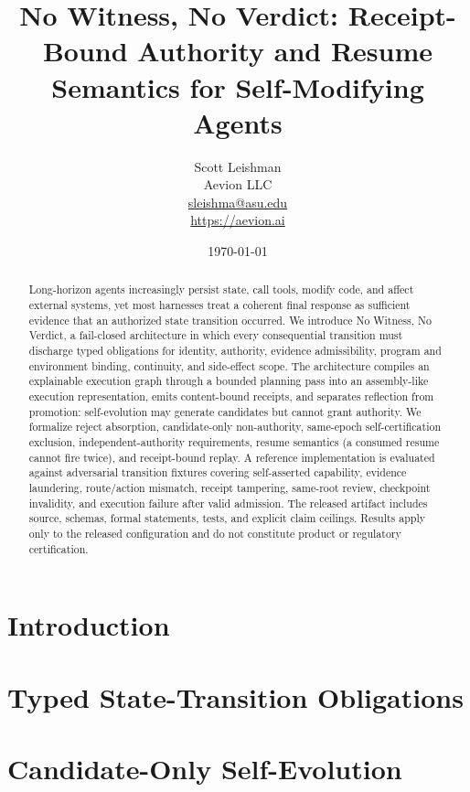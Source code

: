 \documentclass[11pt]{article}
\title{\textbf{No Witness, No Verdict: Receipt-Bound Authority and Resume
Semantics for Self-Modifying Agents}}
\author{Scott Leishman\\
Aevion LLC\\
\href{mailto:sleishma@asu.edu}{sleishma@asu.edu}\\
\href{https://aevion.ai}{https://aevion.ai}}
\date{\today}
\begin{document}
\maketitle

\begin{abstract}
Long-horizon agents increasingly persist state, call tools, modify code, and
affect external systems, yet most harnesses treat a coherent final response
as sufficient evidence that an authorized state transition occurred. We
introduce No Witness, No Verdict, a fail-closed architecture in which every
consequential transition must discharge typed obligations for identity,
authority, evidence admissibility, program and environment binding,
continuity, and side-effect scope. The architecture compiles an explainable
execution graph through a bounded planning pass into an assembly-like
execution representation, emits content-bound receipts, and separates
reflection from promotion: self-evolution may generate candidates but cannot
grant authority. We formalize reject absorption, candidate-only non-authority,
same-epoch self-certification exclusion, independent-authority requirements,
resume semantics (a consumed resume cannot fire twice), and receipt-bound
replay. A reference implementation is evaluated against adversarial
transition fixtures covering self-asserted capability, evidence laundering,
route/action mismatch, receipt tampering, same-root review, checkpoint
invalidity, and execution failure after valid admission. The released
artifact includes source, schemas, formal statements, tests, and explicit
claim ceilings. Results apply only to the released configuration and do not
constitute product or regulatory certification.
\end{abstract}

\section{Introduction}



\section{Typed State-Transition Obligations}



\section{Candidate-Only Self-Evolution}
\end{document}
